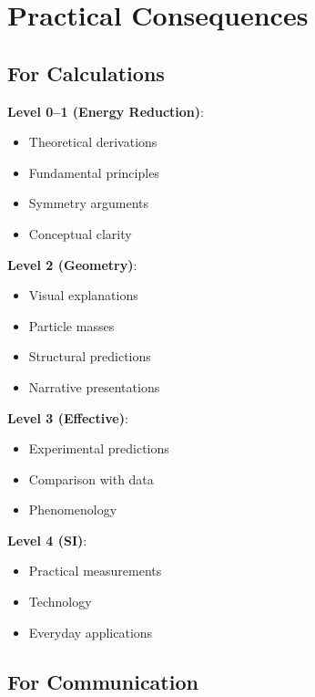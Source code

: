 	\section{Practical Consequences}
	
	\subsection{For Calculations}
	
	\begin{important}
		\textbf{Level 0--1 (Energy Reduction)}:
		\begin{itemize}
			\item Theoretical derivations
			\item Fundamental principles
			\item Symmetry arguments
			\item Conceptual clarity
		\end{itemize}
		
		\textbf{Level 2 (Geometry)}:
		\begin{itemize}
			\item Visual explanations
			\item Particle masses
			\item Structural predictions
			\item Narrative presentations
		\end{itemize}
		
		\textbf{Level 3 (Effective)}:
		\begin{itemize}
			\item Experimental predictions
			\item Comparison with data
			\item Phenomenology
		\end{itemize}
		
		\textbf{Level 4 (SI)}:
		\begin{itemize}
			\item Practical measurements
			\item Technology
			\item Everyday applications
		\end{itemize}
	\end{important}
	
	\subsection{For Communication}
	
